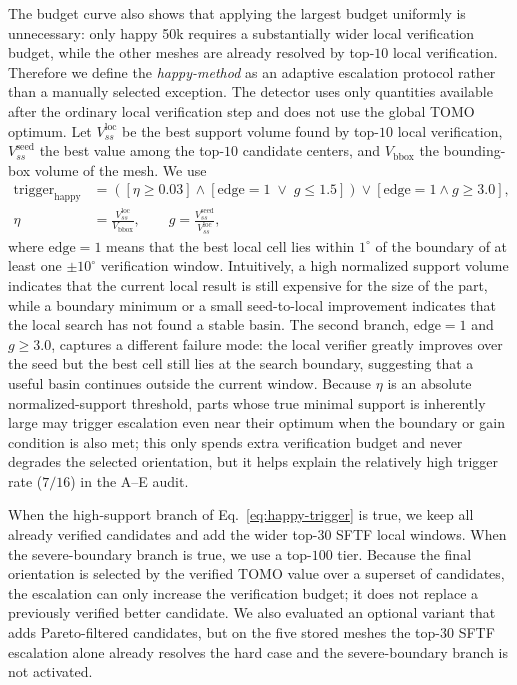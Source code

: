 \documentclass[11pt,a4paper]{article}
\begin{document}
The budget curve also shows that applying the largest budget uniformly is unnecessary:
only happy 50k requires a substantially wider local verification budget, while the other meshes are already resolved by top-$10$ local verification.
Therefore we define the \emph{happy-method} as an adaptive escalation protocol rather than a manually selected exception.
The detector uses only quantities available after the ordinary local verification step and does not use the global TOMO optimum.
Let $V_{ss}^{\mathrm{loc}}$ be the best support volume found by top-$10$ local verification,
$V_{ss}^{\mathrm{seed}}$ the best value among the top-$10$ candidate centers,
and $V_{\mathrm{bbox}}$ the bounding-box volume of the mesh.
We use
\begin{equation}
\begin{aligned}
\mathrm{trigger}_{\mathrm{happy}}
&=
\left(
\left[\eta \ge 0.03\right]
\wedge
\left[\mathrm{edge}=1 \;\vee\; g\le 1.5\right]
\right)
\vee
\left[\mathrm{edge}=1 \wedge g\ge 3.0\right],\\
\eta
&=\frac{V_{ss}^{\mathrm{loc}}}{V_{\mathrm{bbox}}},
\qquad
g=\frac{V_{ss}^{\mathrm{seed}}}{V_{ss}^{\mathrm{loc}}},
\end{aligned}
\label{eq:happy-trigger}
\end{equation}
where $\mathrm{edge}=1$ means that the best local cell lies within $1^\circ$ of the boundary of at least one $\pm 10^\circ$ verification window.
Intuitively, a high normalized support volume indicates that the current local result is still expensive for the size of the part,
while a boundary minimum or a small seed-to-local improvement indicates that the local search has not found a stable basin.
The second branch, $\mathrm{edge}=1$ and $g\ge3.0$, captures a different failure mode:
the local verifier greatly improves over the seed but the best cell still lies at the search boundary, suggesting that a useful basin continues outside the current window.
Because $\eta$ is an absolute normalized-support threshold, parts whose true minimal support is inherently large
may trigger escalation even near their optimum when the boundary or gain condition is also met; this only spends extra verification budget and never degrades the
selected orientation, but it helps explain the relatively high trigger rate ($7/16$) in the A--E audit.

When the high-support branch of Eq.~\eqref{eq:happy-trigger} is true, we keep all already verified candidates and add the wider top-$30$ SFTF local windows.
When the severe-boundary branch is true, we use a top-$100$ tier.
Because the final orientation is selected by the verified TOMO value over a superset of candidates,
the escalation can only increase the verification budget; it does not replace a previously verified better candidate.
We also evaluated an optional variant that adds Pareto-filtered candidates, but on the five stored meshes the top-$30$ SFTF escalation alone already resolves the hard case and the severe-boundary branch is not activated.
\end{document}
